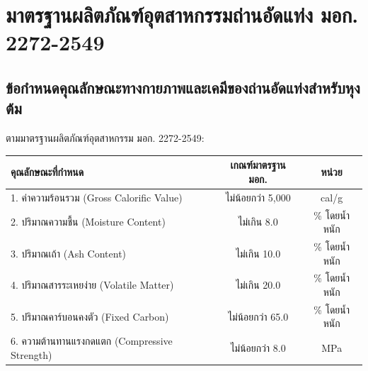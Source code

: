 \chapter{มาตรฐานผลิตภัณฑ์อุตสาหกรรมถ่านอัดแท่ง มอก. 2272-2549}
\label{app:appendixA}

\section{ข้อกำหนดคุณลักษณะทางกายภาพและเคมีของถ่านอัดแท่งสำหรับหุงต้ม}
ตามมาตรฐานผลิตภัณฑ์อุตสาหกรรม มอก. 2272-2549:

\begin{table}[H]
\centering\small
\begin{tabularx}{\textwidth}{p{} c c}
\toprule
\textbf{คุณลักษณะที่กำหนด} & \textbf{เกณฑ์มาตรฐาน มอก.} & \textbf{หน่วย} \\
\midrule
1. ค่าความร้อนรวม (Gross Calorific Value) & ไม่น้อยกว่า 5,000 & cal/g \\
2. ปริมาณความชื้น (Moisture Content) & ไม่เกิน 8.0 & \% โดยน้ำหนัก \\
3. ปริมาณเถ้า (Ash Content) & ไม่เกิน 10.0 & \% โดยน้ำหนัก \\
4. ปริมาณสารระเหยง่าย (Volatile Matter) & ไม่เกิน 20.0 & \% โดยน้ำหนัก \\
5. ปริมาณคาร์บอนคงตัว (Fixed Carbon) & ไม่น้อยกว่า 65.0 & \% โดยน้ำหนัก \\
6. ความต้านทานแรงกดแตก (Compressive Strength) & ไม่น้อยกว่า 8.0 & MPa \\
\bottomrule
\end{tabularx}
\end{table}
